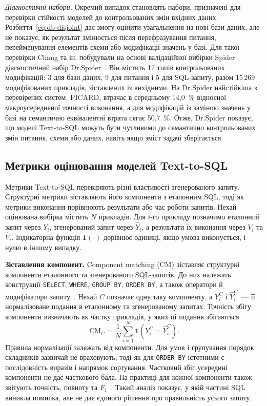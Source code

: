 \documentclass[a4paper,14pt,oneside]{extreport}
\begin{document}
\textit{Діагностичні набори.}
Окремий випадок становлять набори, призначені для перевірки стійкості моделей до контрольованих змін вхідних даних. Розбиття~\eqref{eq:db-disjoint} дає змогу оцінити узагальнення на нові бази даних, але не показує, як результат змінюється після перефразування питання, перейменування елементів схеми або модифікації значень у базі. Для такої перевірки Chang та ін. побудували на основі валідаційної вибірки Spider діагностичний набір Dr.Spider~\cite{chang2023drspider}. Він містить 17 типів контрольованих модифікацій: 3 для бази даних, 9 для питання і 5 для SQL-запиту, разом 15\,269 модифікованих прикладів, зіставлених із вихідними. На Dr.Spider найстійкіша з перевірених систем, PICARD, втрачає в середньому 14,0~\% відносної макроусередненої точності виконання, а для модифікацій із заміною значень у базі на семантично еквівалентні втрата сягає 50,7~\%. Отже, Dr.Spider показує, що моделі Text-to-SQL можуть бути чутливими до семантично контрольованих змін питання, схеми або даних, навіть якщо зміст задачі зберігається.
\subsection{Метрики оцінювання моделей Text-to-SQL}
\label{subsec:text2sql-metrics}

Метрики Text-to-SQL перевіряють різні властивості згенерованого запиту. Структурні метрики зіставляють його компоненти з еталонним SQL, тоді як метрики виконання порівнюють результати або час роботи запитів. Нехай оцінювана вибірка містить \(N\) прикладів. Для \(i\)-го прикладу позначимо еталонний запит через \(Y_i\), згенерований запит через \(\hat Y_i\), а результати їх виконання через \(V_i\) та \(\hat V_i\). Індикаторна функція \(\mathbf{1}(\cdot)\) дорівнює одиниці, якщо умова виконується, і нулю в іншому випадку.

\textbf{Зіставлення компонент.}
Component matching (CM) зіставляє структурні компоненти еталонного та згенерованого SQL-запитів. До них належать конструкції \texttt{SELECT}, \texttt{WHERE}, \texttt{GROUP BY}, \texttt{ORDER BY}, а також оператори й модифікатори запиту~\cite{yu2018spider}. Нехай \(C\) позначає одну таку компоненту, а \(Y_i^C\) і \(\hat Y_i^C\)~--- її нормалізоване подання в еталонному та згенерованому запитах. Точність збігу компоненти визначають як частку прикладів, у яких ці подання збігаються~\cite{liu2025survey}
\begin{equation}
\label{eq:cm}
\mathrm{CM}_{C}
=\frac{1}{N}\sum_{i=1}^{N}
\mathbf{1}\left(Y_i^C=\hat Y_i^C\right).
\end{equation}
Правила нормалізації залежать від компоненти. Для умов і групування порядок складників зазвичай не враховують, тоді як для \texttt{ORDER BY} істотними є послідовність виразів і напрямок сортування. Частковий збіг усередині компоненти не дає часткового бала. На практиці для кожної компоненти також звітують точність, повноту та \(F_1\)~\cite{yu2018spider}. Такий аналіз показує, у якій частині SQL виникла помилка, але не дає єдиного рішення про правильність усього запиту.
\end{document}

